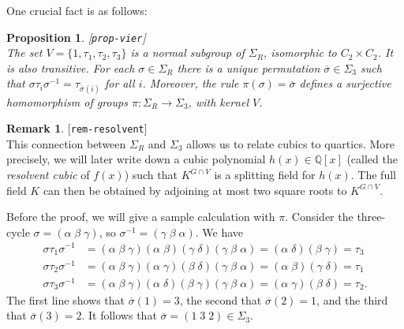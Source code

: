 \documentclass{amsart}
\newcommand{\lbl}[1]{\label{#1}\textup{[\texttt{#1}]}\ \\}
\newcommand{\lbl}{\label}
\newcommand{\Q}         {{\mathbb{Q}}}
\newcommand{\al}        {\alpha}
\newcommand{\bt}        {\beta}
\newcommand{\gm}        {\gamma}
\newcommand{\dl}        {\delta}
\newcommand{\sg}        {\sigma}
\newcommand{\Sg}        {\Sigma}
\newcommand{\ov}[1]     {\overline{#1}}
\newcommand{\tm}        {\times}
\renewcommand{\:}{\colon}
\newtheorem{proposition}[theorem]{Proposition}
\theoremstyle{definition}
\newtheorem{remark}[theorem]{Remark}
\begin{document}
One crucial fact is as follows:
\begin{proposition}\lbl{prop-vier}
 The set $V=\{1,\tau_1,\tau_2,\tau_3\}$ is a normal subgroup of
 $\Sg_R$, isomorphic to $C_2\tm C_2$.  It is also transitive.  For
 each $\sg\in\Sg_R$ there is a unique permutation $\ov{\sg}\in\Sg_3$
 such that $\sg\tau_i\sg^{-1}=\tau_{\ov{\sg}(i)}$ for all $i$.
 Moreover, the rule $\pi(\sg)=\ov{\sg}$ defines a surjective
 homomorphism of groups $\pi\:\Sg_R\to\Sg_3$, with kernel $V$.
\end{proposition}

\begin{remark}\lbl{rem-resolvent}
 This connection between $\Sg_R$ and $\Sg_3$ allows us to relate
 cubics to quartics.  More precisely, we will later write down a cubic
 polynomial $h(x)\in\Q[x]$ (called the \emph{resolvent cubic} of
 $f(x)$) such that $K^{G\cap V}$ is a splitting field for $h(x)$.  The
 full field $K$ can then be obtained by adjoining at most two square
 roots to $K^{G\cap V}$. 
\end{remark}

Before the proof, we will give a sample calculation with $\pi$.
Consider the three-cycle $\sg=(\al\;\bt\;\gm)$, so
$\sg^{-1}=(\gm\;\bt\;\al)$.  We have  
\begin{align*}
 \sg\tau_1\sg^{-1} &= 
  (\al\;\bt\;\gm)(\al\;\bt)(\gm\;\dl)(\gm\;\bt\;\al) = 
  (\al\;\dl)(\bt\;\gm) = \tau_3 \\
 \sg\tau_2\sg^{-1} &= 
  (\al\;\bt\;\gm)(\al\;\gm)(\bt\;\dl)(\gm\;\bt\;\al) = 
  (\al\;\bt)(\gm\;\dl) = \tau_1 \\
 \sg\tau_3\sg^{-1} &= 
  (\al\;\bt\;\gm)(\al\;\dl)(\bt\;\gm)(\gm\;\bt\;\al) = 
  (\al\;\gm)(\bt\;\dl) = \tau_2.
\end{align*}
The first line shows that $\ov{\sg}(1)=3$, the second that
$\ov{\sg}(2)=1$, and the third that $\ov{\sg}(3)=2$.  It follows that
$\ov{\sg}=(1\;3\;2)\in\Sg_3$.
\end{document}
